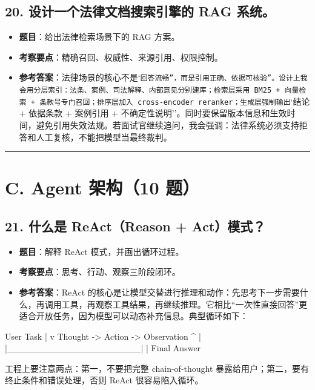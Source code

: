 \subsection{20. 设计一个法律文档搜索引擎的 RAG 系统。}
\begin{itemize}[leftmargin=2em]
\item \textbf{题目}：给出法律检索场景下的 RAG 方案。
\item \textbf{考察要点}：精确召回、权威性、来源引用、权限控制。
\item \textbf{参考答案}：法律场景的核心不是`\texttt{回答流畅''，而是}\texttt{引用正确、依据可核验''。设计上我会用分层索引：法条、案例、司法解释、内部意见分别建库；检索层采用 BM25 + 向量检索 + 条款号专门召回；排序层加入 cross-encoder reranker；生成层强制输出}`结论 + 依据条款 + 案例引用 + 不确定性说明''。同时要保留版本信息和生效时间，避免引用失效法规。若面试官继续追问，我会强调：法律系统必须支持拒答和人工复核，不能把模型当最终裁判。
\end{itemize}

\bigskip\hrule\bigskip

\section{C. Agent 架构（10 题）}

\subsection{21. 什么是 ReAct（Reason + Act）模式？}
\begin{itemize}[leftmargin=2em]
\item \textbf{题目}：解释 ReAct 模式，并画出循环过程。
\item \textbf{考察要点}：思考、行动、观察三阶段闭环。
\item \textbf{参考答案}：ReAct 的核心是让模型交替进行推理和动作：先思考下一步需要什么，再调用工具，再观察工具结果，再继续推理。它相比``一次性直接回答''更适合开放任务，因为模型可以动态补充信息。典型循环如下：
\end{itemize}

\begin{codeblock}
User Task
   |
   v
Thought -> Action -> Observation
   ^                     |
   |_____________________|
             |
        Final Answer
\end{codeblock}

工程上要注意两点：第一，不要把完整 chain-of-thought 暴露给用户；第二，要有终止条件和错误处理，否则 ReAct 很容易陷入循环。


